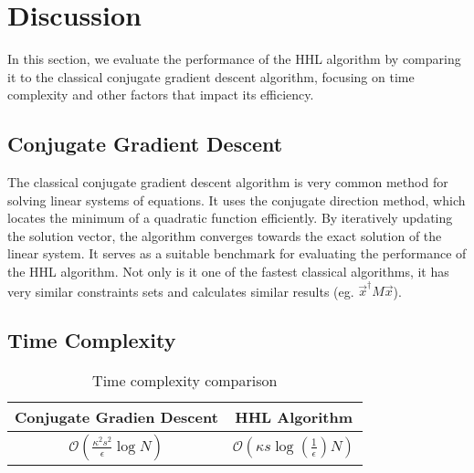 \section{Discussion}


\begin{comment}

look at gauß verfahren 
not fastest
look at same constraints 
conjugate gradient descent much faster with similiar requirements
only interested in estimate of $\vec{x}^\dagger M \vec x$
this runs in $ \mathcal{O}(\kappa s log{\left(\frac 1 \epsilon\right)} N ) $
where 
\end{comment}

In this section, we evaluate the performance of the HHL algorithm by comparing it to the classical conjugate gradient descent algorithm, focusing on time complexity and other factors that impact its efficiency.

\subsection{Conjugate Gradient Descent}

The classical conjugate gradient descent algorithm is very common method for solving linear systems of equations. 
It uses the conjugate direction method, which locates the minimum of a quadratic function efficiently.
By iteratively updating the solution vector, the algorithm converges towards the exact solution of the linear system.
It serves as a suitable benchmark for evaluating the performance of the HHL algorithm. 
Not only is it one of the fastest classical algorithms, it has very similar constraints sets and calculates similar results (eg. $\vec{x}^\dagger M \vec x$).

\subsection{Time Complexity}


\begin{table}[htbp]
\caption{Time complexity comparison}
\begin{center}
\begin{tabular}{|c|c|}
\hline
\textbf{Conjugate Gradien Descent} & \textbf{HHL Algorithm} \\
\hline
$\mathcal{O}\left(\frac{\kappa^2s^2}{\epsilon}\log N\right)$& $\mathcal{O}(\kappa s \log\left(\frac{1}{\epsilon}\right) N)$ \\
\hline
\end{tabular}
\end{center}
\end{table}


